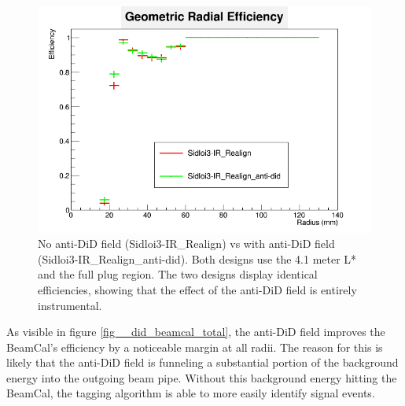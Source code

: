 \documentclass{report}
\begin{document}
                \begin{figure}[H]
                    \includegraphics[height=.4\textheight]{RadialEfficiency_geometric_did}
                    \centering
                    \caption{No anti-DiD field (Sidloi3-IR\_Realign) vs with anti-DiD field 
                            (Sidloi3-IR\_Realign\_anti-did). Both designs use the 4.1 meter L*
                            and the full plug region. The two designs display identical efficiencies,
                            showing that the effect of the anti-DiD field is entirely instrumental.}
                    \label{fig__did_beamcal_geom}
                \end{figure}

                As visible in figure \ref{fig__did_beamcal_total}, the anti-DiD field improves the BeamCal's efficiency by a noticeable margin at all radii. The reason for this is likely that the anti-DiD field is funneling a substantial portion of the background energy into the outgoing beam pipe. Without this background energy hitting the BeamCal, the tagging algorithm is able to more easily identify signal events.
\end{document}
